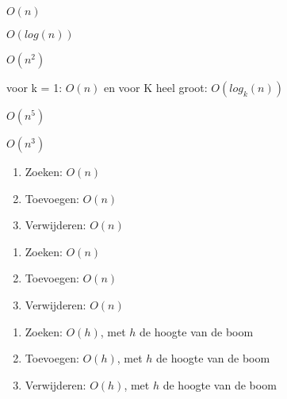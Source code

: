 \begin{Oplossing}{11.1}
\(O(n)\)
\end{Oplossing}
\begin{Oplossing}{11.2}
\(O(log(n))\)
\end{Oplossing}
\begin{Oplossing}{11.3}
\(O(n^2)\)
\end{Oplossing}
\begin{Oplossing}{11.4}
voor k = 1: \(O(n)\) en
voor K heel groot: \(O(log_k(n))\)
\end{Oplossing}
\begin{Oplossing}{11.5}
\(O(n^5)\)
\end{Oplossing}
\begin{Oplossing}{11.6}
\(O(n^3)\)
\end{Oplossing}
\begin{Oplossing}{11.7}
\begin{enumerate}
\item Zoeken: \(O(n)\)
\item Toevoegen: \(O(n)\)
\item Verwijderen: \(O(n)\)
\end{enumerate}
\end{Oplossing}
\begin{Oplossing}{11.8}
\begin{enumerate}
\item Zoeken: \(O(n)\)
\item Toevoegen: \(O(n)\)
\item Verwijderen: \(O(n)\)
\end{enumerate}
\end{Oplossing}
\begin{Oplossing}{11.9}
\begin{enumerate}
\item Zoeken: \(O(h)\), met \(h\) de hoogte van de boom
\item Toevoegen: \(O(h)\), met \(h\) de hoogte van de boom
\item Verwijderen: \(O(h)\), met \(h\) de hoogte van de boom
\end{enumerate}
\end{Oplossing}
